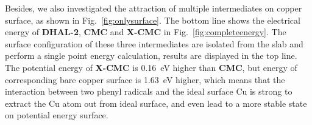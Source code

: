\documentclass[%
 reprint,
 amsmath,amssymb,
 aps,
prb,
floatfix,
]{revtex4-2}
\begin{document}
{Besides, we also investigated the attraction of multiple intermediates on copper surface, as shown in Fig.~\ref{fig:onlysurface}. The bottom line shows the electrical energy of \textbf{DHAL-2}, \textbf{CMC} and \textbf{X-CMC} in Fig.~\ref{fig:completeenergy}. The surface configuration of these three intermediates are isolated from the slab and perform a single point energy calculation, results are displayed in the top line. The potential energy of \textbf{X-CMC} is \SI{0.16}{\electronvolt} higher than \textbf{CMC}, but energy of corresponding bare copper surface is \SI{1.63}{\electronvolt} higher, which means that the interaction between two phenyl radicals and the ideal surface Cu is strong to extract the Cu atom out from ideal surface, and even lead to a more stable state on potential energy surface.

}
\end{document}
